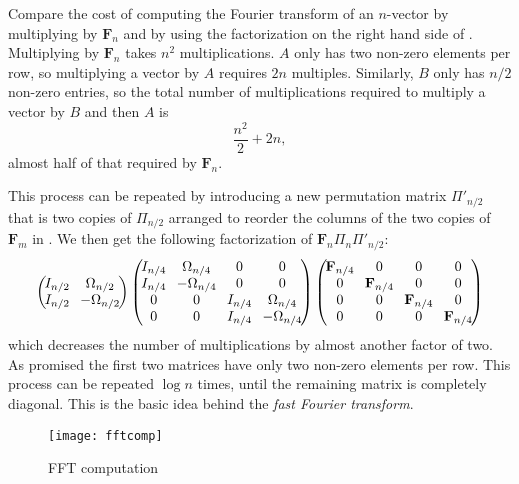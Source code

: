 Compare the cost of
computing the Fourier transform of an $n$-vector by multiplying by
$\mathbf{F}_n$ and by using the factorization on the right hand side of
.   Multiplying by $\mathbf{F}_n$ takes $n^2$
multiplications.  $A$ only has two non-zero elements per row, so
multiplying a vector by $A$ requires $2n$ multiples.  Similarly, $B$
only has $n/2$ non-zero entries, so the total number of
multiplications required to multiply a vector by $B$ and then $A$ is
\[
\frac{n^2}{2} + 2n,
\]
almost half of that required by $\mathbf{F}_n$.

This process can be repeated by introducing a new permutation matrix
$\Pi'_{n/2}$ that is two copies of $\Pi_{n/2}$ arranged to reorder the
columns of the two copies of $\mathbf{F}_m$ in .
We then get the following factorization of $\mathbf{F}_{n}\Pi_{n}
\Pi'_{n/2}$:
\[
{\arraycolsep=3.75pt
\left(\!\!\!\begin{array}{cc}
  I_{n/2} & \Omega_{n/2} \\ 
  I_{n/2} & -\Omega_{n/2}
\end{array}\!\!\!\right)
\left(\!\!\!\begin{array}{cccc}
I_{n/4} & \Omega_{n/4} & 0 & 0\\ 
I_{n/4} &-\Omega_{n/4} & 0 & 0\\
0 & 0 & I_{n/4} & \Omega_{n/4} \\ 
0 & 0 & I_{n/4} & -\Omega_{n/4}\end{array}\!\!\!\right)
\left(\!\!\!\begin{array}{cccc}
\mathbf{F}_{n/4} & 0 & 0 & 0\\ 
0 & \mathbf{F}_{n/4} & 0 & 0 \\ 
0 & 0 & \mathbf{F}_{n/4} & 0 \\ 
0 & 0 & 0 & \mathbf{F}_{n/4}\end{array}\!\!\!\right)}
\]
which decreases the number of multiplications by almost another factor
of two.  As promised the first two matrices have only two non-zero
elements per row.  This process can be repeated $\log n$ times, until
the remaining matrix is completely diagonal.  This is the basic idea
behind the {\em fast Fourier transform\/}.

\begin{figure}
\begin{center}
\texttt{[image: fftcomp]}
\end{center}
\caption{FFT computation\label{Poly:FFTComp:Fig}}
\end{figure}

